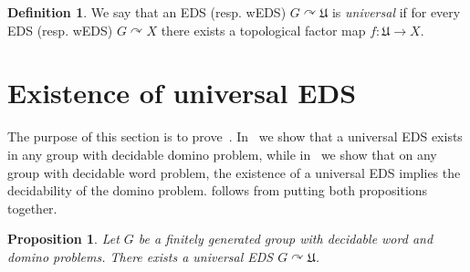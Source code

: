 \documentclass{article}
\newtheorem{proposition}[theorem]{Proposition}
\theoremstyle{definition}
\newtheorem{definition}[theorem]{Definition}
\theoremstyle{plain}
\newcommand{\define}[1]{\textit{#1}}
\begin{document}
 \begin{definition}
        We say that an EDS (resp. wEDS) $G\curvearrowright \mathfrak{U}$ is \define{universal} if for every EDS (resp. wEDS) $G\curvearrowright X$ there exists a topological factor map $f\colon \mathfrak{U}\to X$.
    \end{definition}

\section{Existence of universal EDS}\label{sec:universalEDS}

The purpose of this section is to prove~. In~ we show that a universal EDS exists in any group with decidable domino problem, while in~ we show that on any group with decidable word problem, the existence of a universal EDS implies the decidability of the domino problem.  follows from putting both propositions together.



\begin{proposition}\label{prop:decid_DP}
    Let $G$ be a finitely generated group with decidable word and domino problems. There exists a universal EDS $G\curvearrowright \mathfrak{U}$.
\end{proposition}
\end{document}
